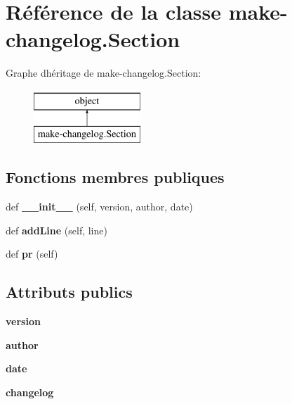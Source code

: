 \hypertarget{classmake-changelog_1_1_section}{}\section{Référence de la classe make-\/changelog.Section}
\label{classmake-changelog_1_1_section}
Graphe d\textquotesingle{}héritage de make-\/changelog.Section\+:\begin{figure}[H]
\begin{center}
\leavevmode
\includegraphics[height=2.000000cm]{classmake-changelog_1_1_section}
\end{center}
\end{figure}
\subsection*{Fonctions membres publiques}
\begin{DoxyCompactItemize}
\item 
\mbox{\label{classmake-changelog_1_1_section_aa07851f79a4631fc328ca87f1170e128}} 
def {\bfseries \+\_\+\+\_\+init\+\_\+\+\_\+} (self, version, author, date)
\item 
\mbox{\label{classmake-changelog_1_1_section_a04d870b329d516d9e824b9345ca1413a}} 
def {\bfseries add\+Line} (self, line)
\item 
\mbox{\label{classmake-changelog_1_1_section_ab087cd1f120359c542a30deb4d173760}} 
def {\bfseries pr} (self)
\end{DoxyCompactItemize}
\subsection*{Attributs publics}
\begin{DoxyCompactItemize}
\item 
\mbox{\label{classmake-changelog_1_1_section_af0f07835eb23722dc5ea14304e873c9f}} 
{\bfseries version}
\item 
\mbox{\label{classmake-changelog_1_1_section_a61a040fa8ede2f14934ca4cb9fc5fff9}} 
{\bfseries author}
\item 
\mbox{\label{classmake-changelog_1_1_section_a61075420b94a30e76e4d727816c42e40}} 
{\bfseries date}
\item 
\mbox{\label{classmake-changelog_1_1_section_a3948e8ee71cf2eb5328359aee56df6e6}} 
{\bfseries changelog}
\end{DoxyCompactItemize}
